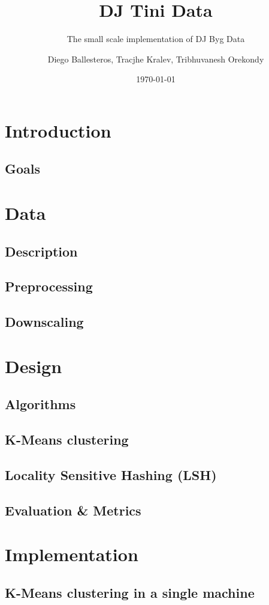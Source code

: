 \documentclass[11pt,a4paper,twoside]{scrartcl}
\author{Diego Ballesteros, Tracjhe Kralev, Tribhuvanesh Orekondy}
\title{DJ Tini Data}
\subtitle{The small scale implementation of DJ Byg Data}
\date{\today}
\begin{document}
  \maketitle
  \section{Introduction}
    \subsection{Goals}
  \section{Data}
    \subsection{Description}
    \subsection{Preprocessing}
    \subsection{Downscaling}
  \section{Design}
    \subsection{Algorithms}
      \subsection{K-Means clustering}
      \subsection{Locality Sensitive Hashing (LSH)}
    \subsection{Evaluation \& Metrics}
  \section{Implementation}
    \subsection{K-Means clustering in a single machine}
\end{document}
